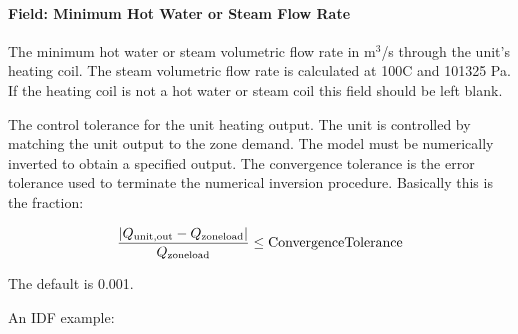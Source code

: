 \paragraph{Field: Minimum Hot Water or Steam Flow Rate}\label{field-minimum-hot-water-or-steam-flow-rate-2}

The minimum hot water or steam volumetric flow rate in m\(^{3}\)/s through the unit's heating coil. The steam volumetric flow rate is calculated at 100C and 101325 Pa. If the heating coil is not a hot water or steam coil this field should be left blank.

The control tolerance for the unit heating output. The unit is controlled by matching the unit output to the zone demand. The model must be numerically inverted to obtain a specified output. The convergence tolerance is the error tolerance used to terminate the numerical inversion procedure. Basically this is the fraction:

\begin{equation}
  \frac{\left| Q_{\rm{unit, out}} - Q_{\rm{zone load}} \right|}{Q_{\rm{zone load}}} \le \rm{ConvergenceTolerance}
\end{equation}


The default is 0.001.

An IDF example:

